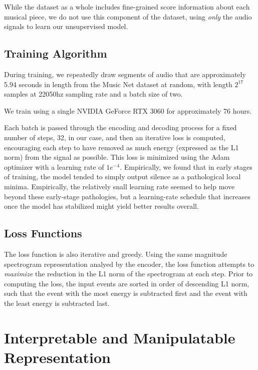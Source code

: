\documentclass[9pt,conference]{IEEEtran}
\begin{document}
While the dataset as a whole includes fine-grained score information about each musical piece, 
we do not use this component of the dataset, using \emph{only} the audio signals to learn our 
unsupervised model.


\subsection{Training Algorithm}
\label{ssec:training}

During training, we repeatedly draw segments of audio that are approximately 5.94 seconds in 
length from the Music Net dataset at random, with 
length ${2^{17}}$ samples at 22050hz sampling rate and a batch size of two.  

We train using a single NVIDIA GeForce RTX 3060 for approximately 76 hours.

Each batch is passed through the encoding and decoding process for a fixed number of steps, 32, in 
our case, and then an iterative loss is computed, encouraging each step to have removed as much 
energy (expressed as the L1 norm) from the signal as possible.  This loss is minimized using 
the Adam optimizer with a learning rate of ${1e^{-4}}$.  
Empirically, we found that in early stages of training, the model 
tended to simply output silence as a pathological local minima.  
Empirically, the relatively snall learning rate seemed to help move beyond these early-stage 
pathologies, but a learning-rate schedule that increases once the model
has stabilized might yield better results overall.


\subsection{Loss Functions}
\label{ssec:loss_functions}

The loss function is also iterative and greedy.  Using the same 
magnitude spectrogram representation analyed by the encoder, 
the loss function attempts to \emph{maximize} the reduction in the 
L1 norm of the spectrogram at each step.  Prior to computing 
the loss, the input events are sorted in order of descending 
L1 norm, such that the event with the most energy is subtracted 
first and the event with the least energy is subtracted last.



\section{Interpretable and Manipulatable Representation}
\label{sec:interpretable_representation}
\end{document}
